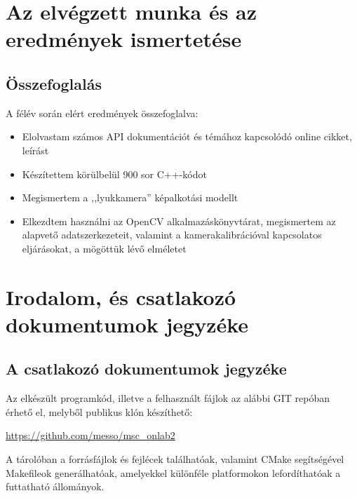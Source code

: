 \documentclass[a4paper,oneside]{article}
\begin{document}
\newpage
\section{Az elvégzett munka és az eredmények ismertetése}
\label{sec:az-elvegzett-munka}

\subsection{Összefoglalás}
\label{sec:osszefoglalas}

A félév során elért eredmények összefoglalva:
\begin{itemize}
\item Elolvastam számos API dokumentációt és témához kapcsolódó online cikket, leírást
\item Készítettem körülbelül 900 sor C++-kódot
\item Megismertem a ,,lyukkamera'' képalkotási modellt
\item Elkezdtem használni az OpenCV alkalmazáskönyvtárat, megismertem az alapvető adatszerkezeteit, valamint a kamerakalibrációval kapcsolatos eljárásokat, a mögöttük lévő elméletet
\end{itemize}
\newpage
 
\section{Irodalom, és csatlakozó dokumentumok jegyzéke}
\label{sec:irod-es-csatl}

\printbibliography[title={Irodalomjegyzék}]

\subsection{A csatlakozó dokumentumok jegyzéke}
\label{sec:csat-irod}

Az elkészült programkód, illetve a felhasznált fájlok az alábbi GIT repóban érhető el, melyből publikus klón készíthető:
\begin{center}
\url{https://github.com/messo/msc_onlab2}
\end{center}

A tárolóban a forrásfájlok és fejlécek találhatóak, valamint CMake segítségével Makefileok generálhatóak, amelyekkel különféle platformokon lefordíthatóak a futtatható állományok.
\end{document}

